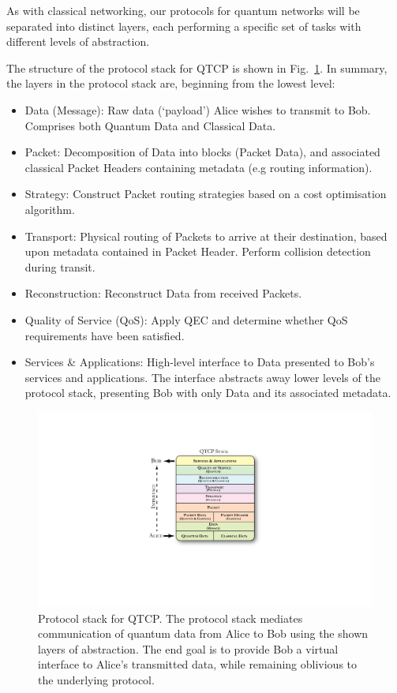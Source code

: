 \documentclass[aps,rmp,twocolumn,amsmath,amssymb,nofootinbib,superscriptaddress]{revtex4}
\begin{document}
As with classical networking, our protocols for quantum networks will be separated into distinct layers, each performing a specific set of tasks with different levels of abstraction.

The structure of the protocol stack for QTCP is shown in Fig.~\ref{fig:stack}. In summary, the layers in the protocol stack are, beginning from the lowest level:
\begin{itemize}
\item {\sc Data (Message)}: Raw data (`payload') Alice wishes to transmit to Bob. Comprises both {\sc Quantum Data} and {\sc Classical Data}.
\item {\sc Packet}: Decomposition of {\sc Data} into blocks ({\sc Packet Data}), and associated classical {\sc Packet Headers} containing metadata (e.g routing information).
\item {\sc Strategy}: Construct {\sc Packet} routing strategies based on a cost optimisation algorithm.
\item {\sc Transport}: Physical routing of {\sc Packets} to arrive at their destination, based upon metadata contained in {\sc Packet Header}. Perform collision detection during transit.
\item {\sc Reconstruction}: Reconstruct {\sc Data} from received {\sc Packets}.
\item {\sc Quality of Service (QoS)}: Apply QEC and determine whether {\sc QoS} requirements have been satisfied.
\item {\sc Services \& Applications}: High-level interface to {\sc Data} presented to Bob's services and applications. The interface abstracts away lower levels of the protocol stack, presenting Bob with only {\sc Data} and its associated metadata.
\end{itemize}

\begin{figure}[!htb]
\includegraphics[width=\columnwidth]{stack}
\caption{Protocol stack for QTCP. The protocol stack mediates communication of quantum data from Alice to Bob using the shown layers of abstraction. The end goal is to provide Bob a virtual interface to Alice's transmitted data, while remaining oblivious to the underlying protocol.} \label{fig:stack}
\end{figure}
\end{document}

